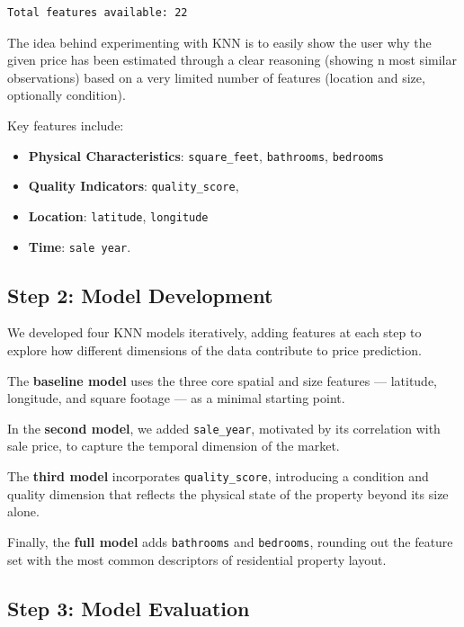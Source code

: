 \documentclass[
  english,
  letterpaper,
  DIV=11,
  numbers=noendperiod]{scrreprt}
\providecommand{\tightlist}{%
  \setlength{\itemsep}{0pt}\setlength{\parskip}{0pt}}
\begin{document}
\begin{verbatim}
Total features available: 22 
\end{verbatim}

The idea behind experimenting with KNN is to easily show the user why
the given price has been estimated through a clear reasoning (showing n
most similar observations) based on a very limited number of features
(location and size, optionally condition).

Key features include:

\begin{itemize}
\tightlist
\item
  \textbf{Physical Characteristics}: \texttt{square\_feet},
  \texttt{bathrooms}, \texttt{bedrooms}
\item
  \textbf{Quality Indicators}: \texttt{quality\_score},
\item
  \textbf{Location}: \texttt{latitude}, \texttt{longitude}
\item
  \textbf{Time}: \texttt{sale\ year}.
\end{itemize}

\subsection{Step 2: Model Development}\label{step-2-model-development-1}

We developed four KNN models iteratively, adding features at each step
to explore how different dimensions of the data contribute to price
prediction.

The \textbf{baseline model} uses the three core spatial and size
features --- latitude, longitude, and square footage --- as a minimal
starting point.

In the \textbf{second model}, we added \texttt{sale\_year}, motivated by
its correlation with sale price, to capture the temporal dimension of
the market.

The \textbf{third model} incorporates \texttt{quality\_score},
introducing a condition and quality dimension that reflects the physical
state of the property beyond its size alone.

Finally, the \textbf{full model} adds \texttt{bathrooms} and
\texttt{bedrooms}, rounding out the feature set with the most common
descriptors of residential property layout.

\subsection{Step 3: Model Evaluation}\label{step-3-model-evaluation}
\end{document}
